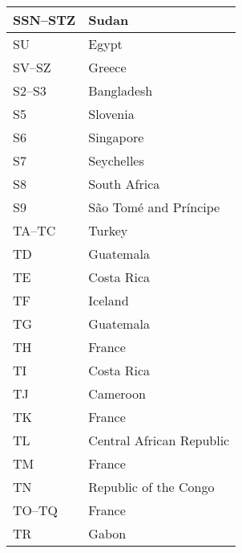 \begin{longtable}{|l|l|}
  SSN--STZ            & Sudan                                     \\
  \hline
  SU                  & Egypt                                     \\
  \hline
  SV--SZ              & Greece                                    \\
  \hline
  S2--S3              & Bangladesh                                \\
  \hline
  S5                  & Slovenia                                  \\
  \hline
  S6                  & Singapore                                 \\
  \hline
  S7                  & Seychelles                                \\
  \hline
  S8                  & South Africa                              \\
  \hline
  S9                  & São Tomé and Príncipe                     \\
  \hline
  TA--TC              & Turkey                                    \\
  \hline
  TD                  & Guatemala                                 \\
  \hline
  TE                  & Costa Rica                                \\
  \hline
  TF                  & Iceland                                   \\
  \hline
  TG                  & Guatemala                                 \\
  \hline
  TH                  & France                                    \\
  \hline
  TI                  & Costa Rica                                \\
  \hline
  TJ                  & Cameroon                                  \\
  \hline
  TK                  & France                                    \\
  \hline
  TL                  & Central African Republic                  \\
  \hline
  TM                  & France                                    \\
  \hline
  TN                  & Republic of the Congo                     \\
  \hline
  TO--TQ              & France                                    \\
  \hline
  TR                  & Gabon                                     \\

\end{longtable}
